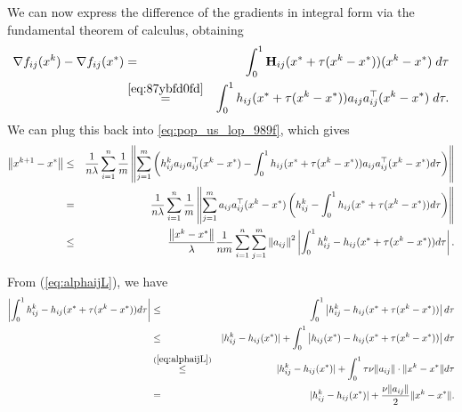 \documentclass[12pt]{article}
\newcommand{\norm}[1]{\left\|#1\right\|}
\newcommand{\mH}{\mathbf{H}}
\begin{document}
We can now express the difference of the gradients in integral form via the fundamental theorem of calculus, obtaining 
\begin{eqnarray*} \nabla f_{ij}(x^k) - \nabla f_{ij}(x^*) &=&   \int_{0}^1 \mH_{ij} (x^* + \tau(x^k - x^*)) (x^k - x^*) \; d\tau \\
&\overset{\eqref{eq:87ybfd0fd}}{=} & \int_{0}^1 h_{ij}(x^* + \tau(x^k - x^*)) a_{ij}a_{ij}^\top  (x^k - x^*)\; d\tau .\end{eqnarray*}
We can plug this back into \eqref{eq:pop_us_lop_989f}, which gives
\begin{eqnarray}	
\norm{ x^{k+1} - x^* }	&\leq & 
 \frac{1}{n \lambda} \sum_{i=1}^n \frac{1}{m} \norm{  \sum_{j=1}^{m} \left(  h_{ij}^k a_{ij}a_{ij}^\top (x^k - x^*)  -  \int_{0}^1 h_{ij} (x^* + \tau(x^k - x^*))a_{ij}a_{ij}^\top (x^k - x^*)d\tau  \right)   } \notag \\ 
	&=& \frac{1}{n \lambda} \sum_{i=1}^n \frac{1}{m} \norm{  \sum_{j=1}^{m}  a_{ij}a_{ij}^\top (x^k - x^*) \left( h_{ij}^k - \int_{0}^1 h_{ij}(x^* + \tau(x^k - x^*))  d\tau \right) }\notag \\ 
	&\leq& \frac{ \norm{x^k - x^*}}{ \lambda} \frac{1}{nm} \sum_{i=1}^n \sum_{j=1}^{m} \norm{a_{ij}}^2 \left|   \int_{0}^1 h_{ij}^k - h_{ij}(x^* + \tau(x^k - x^*))  d\tau  \right|. \label{petrol-09809fd}
\end{eqnarray}

From (\ref{eq:alphaijL}), we have 
\begin{eqnarray}
	\left|   \int_{0}^1 h_{ij}^k - h_{ij}(x^* + \tau(x^k - x^*))  d\tau  \right| &\leq& \int_{0}^1 \left|  h_{ij}^k - h_{ij}(x^* + \tau(x^k - x^*))   \right| d\tau \notag \\
	&\leq& |h_{ij}^k - h_{ij}(x^*)| + \int_{0}^1 \left|  h_{ij}(x^*) -  h_{ij}(x^* + \tau(x^k - x^*))   \right| d \tau \notag \\ 
	&\overset{(\ref{eq:alphaijL})}{\leq}&  |h_{ij}^k - h_{ij}(x^*)| + \int_{0}^1 \tau \nu \|a_{ij}\| \cdot \|x^k - x^*\| d\tau  \notag \\ 
	&=&  |h_{ij}^k - h_{ij}(x^*)| + \frac{\nu \|a_{ij}\|}{2} \|x^k-x^*\|. \label{eq:olive-09u0hfdih}
\end{eqnarray}
\end{document}
